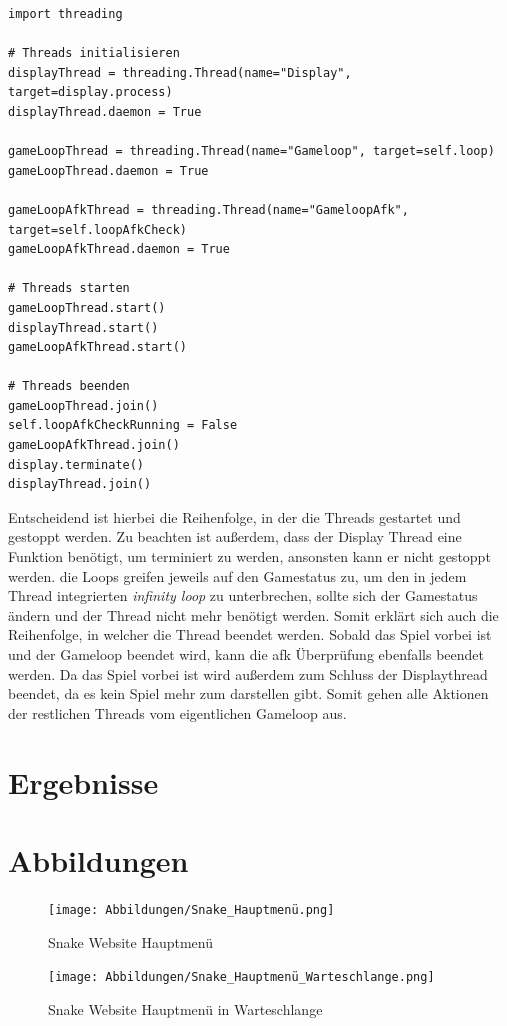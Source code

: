 \documentclass[a4paper,12pt]{scrartcl}
\begin{document}
\begin{lstlisting}
import threading

# Threads initialisieren
displayThread = threading.Thread(name="Display", target=display.process)
displayThread.daemon = True

gameLoopThread = threading.Thread(name="Gameloop", target=self.loop)
gameLoopThread.daemon = True

gameLoopAfkThread = threading.Thread(name="GameloopAfk", target=self.loopAfkCheck)
gameLoopAfkThread.daemon = True
        
# Threads starten
gameLoopThread.start()
displayThread.start()
gameLoopAfkThread.start()

# Threads beenden
gameLoopThread.join()
self.loopAfkCheckRunning = False
gameLoopAfkThread.join()
display.terminate()
displayThread.join()
\end{lstlisting}

Entscheidend ist hierbei die Reihenfolge, in der die Threads gestartet und gestoppt werden. Zu beachten ist außerdem, dass der Display Thread eine Funktion benötigt, um terminiert zu werden, ansonsten kann er nicht gestoppt werden. die Loops greifen jeweils auf den Gamestatus zu, um den in jedem Thread integrierten \textit{infinity loop} zu unterbrechen, sollte sich der Gamestatus ändern und der Thread nicht mehr benötigt werden. Somit erklärt sich auch die Reihenfolge, in welcher die Thread beendet werden. Sobald das Spiel vorbei ist und der Gameloop beendet wird, kann die afk Überprüfung ebenfalls beendet werden. Da das Spiel vorbei ist wird außerdem zum Schluss der Displaythread beendet, da es kein Spiel mehr zum darstellen gibt. Somit gehen alle Aktionen der restlichen Threads vom eigentlichen Gameloop aus.

\section{Ergebnisse}

\newpage
\section{Abbildungen}

\begin{figure}[!h]
   \begin{minipage}[t]{.4\linewidth}
      \texttt{[image: Abbildungen/Snake\_Hauptmenü.png]}
      \caption{Snake Website Hauptmenü}
      \label{fig:main-menu}
   \end{minipage}
   \hspace{.1\linewidth}%
   \begin{minipage}[t]{.4\linewidth}
      \texttt{[image: Abbildungen/Snake\_Hauptmenü\_Warteschlange.png]}
      \caption{Snake Website Hauptmenü in Warteschlange}
      \label{fig:main-menu-queue}
   \end{minipage}
\end{figure}
\end{document}
